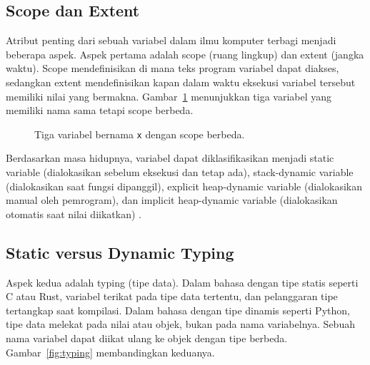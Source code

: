 \documentclass[11pt,a4paper]{article}
\begin{document}
\subsection{Scope dan Extent}

Atribut penting dari sebuah variabel dalam ilmu komputer terbagi menjadi beberapa aspek. Aspek pertama adalah scope (ruang lingkup) dan extent (jangka waktu). Scope mendefinisikan di mana teks program variabel dapat diakses, sedangkan extent mendefinisikan kapan dalam waktu eksekusi variabel tersebut memiliki nilai yang bermakna. Gambar~\ref{fig:scope} menunjukkan tiga variabel yang memiliki nama sama tetapi scope berbeda.

\begin{figure}[H]
	\centering
	\caption{Tiga variabel bernama \texttt{x} dengan scope berbeda.}
	\label{fig:scope}
\end{figure}

Berdasarkan masa hidupnya, variabel dapat diklasifikasikan menjadi static variable (dialokasikan sebelum eksekusi dan tetap ada), stack-dynamic variable (dialokasikan saat fungsi dipanggil), explicit heap-dynamic variable (dialokasikan manual oleh pemrogram), dan implicit heap-dynamic variable (dialokasikan otomatis saat nilai diikatkan) \cite{wikipedia_cs}.

\subsection{Static versus Dynamic Typing}

Aspek kedua adalah typing (tipe data). Dalam bahasa dengan tipe statis seperti C atau Rust, variabel terikat pada tipe data tertentu, dan pelanggaran tipe tertangkap saat kompilasi. Dalam bahasa dengan tipe dinamis seperti Python, tipe data melekat pada nilai atau objek, bukan pada nama variabelnya. Sebuah nama variabel dapat diikat ulang ke objek dengan tipe berbeda. Gambar~\ref{fig:typing} membandingkan keduanya.
\end{document}
